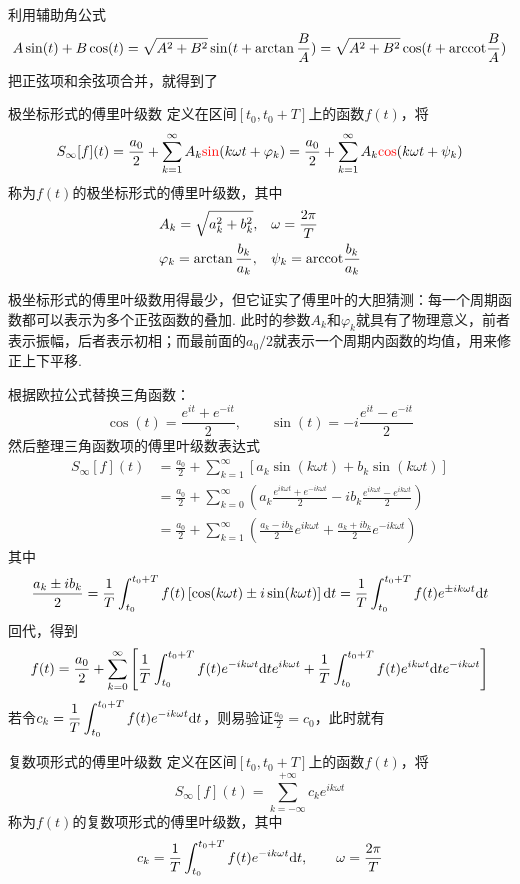 \documentclass[main.tex]{subfiles}
\begin{document}
利用辅助角公式
\[A\sin(t)+B\cos(t)=\sqrt{A^2+B^2}\sin(t+\arctan\frac{B}{A}) = \sqrt{A^2+B^2}\cos(t+{\rm arccot}\frac{B}{A})\]
把正弦项和余弦项合并，就得到了
\begin{definition}{极坐标形式的傅里叶级数}
    定义在区间\([t_0,t_0+T]\)上的函数\(f(t)\)，将
    \[S_{\infty}[f](t) = \frac{a_0}{2}+\sum_{k=1}^{\infty} A_k{\color{red}\sin}(k\omega t+\varphi_k) = \frac{a_0}{2}+\sum_{k=1}^{\infty} A_k{\color{red}\cos}(k\omega t+\psi_k)\]
    称为\(f(t)\)的极坐标形式的傅里叶级数，其中
    \[
        \begin{aligned}
            & A_k = \sqrt{a_k^2+b_k^2},  && \omega = \frac{2\pi}{T} \\
            & \varphi_k = \arctan\frac{b_k}{a_k}, && \psi_k = {\rm arccot}\frac{b_k}{a_k}
        \end{aligned}
    \]
\end{definition}

极坐标形式的傅里叶级数用得最少，但它证实了傅里叶的大胆猜测：每一个周期函数都可以表示为多个正弦函数的叠加. 此时的参数\(A_k\)和\(\varphi_k\)就具有了物理意义，前者表示振幅，后者表示初相；而最前面的\(a_0/2\)就表示一个周期内函数的均值，用来修正上下平移.

\vspace{1cm}

根据欧拉公式替换三角函数：
\[ \cos(t) = \frac{e^{it}+e^{-it}}{2}, \qquad \sin(t) = -i\frac{e^{it}-e^{-it}}{2} \]
然后整理三角函数项的傅里叶级数表达式
\begin{align*}
    S_{\infty}[f](t) &= \frac{a_0}{2}+\sum_{k=1}^{\infty} \left[a_k\sin(k\omega t)+b_k\sin(k\omega t)\right] \\
    &= \frac{a_0}{2} + \sum_{k=0}^{\infty}\left(a_k\frac{e^{ik\omega t}+e^{-ik\omega t}}{2}-ib_k\frac{e^{ik\omega t}-e^{ik\omega t}}{2} \right) \\
    &= \frac{a_0}{2}+\sum_{k=1}^{\infty}\left( \frac{a_k-ib_k}{2}e^{ik\omega t}+\frac{a_k+ib_k}{2}e^{-ik\omega t}\right)
\end{align*}
其中
\[\frac{a_k \pm ib_k}{2} = \frac{1}{T}\int_{t_0}^{t_0+T}f(t)\left[\cos(k\omega t) \pm i\sin(k\omega t) \right] {\rm d}t = \frac{1}{T}\int_{t_0}^{t_0+T}f(t)e^{\pm ik\omega t}{\rm d}t\]
回代，得到
\[f(t) = \frac{a_0}{2} + \sum_{k=0}^{\infty}\left[ \frac{1}{T} \int_{t_0}^{t_0+T}f(t)e^{-ik\omega t}{\rm d}te^{ik\omega t}+ \frac{1}{T}\int_{t_0}^{t_0+T}f(t)e^{ik\omega t}{\rm d}te^{-ik\omega t}\right]\]
若令\(\displaystyle{c_k = \frac{1}{T} \int_{t_0}^{t_0+T}f(t)e^{-ik\omega t}{\rm d}t}\)，则易验证\(\displaystyle{\frac{a_0}{2} = c_0}\)，此时就有
\begin{definition}{复数项形式的傅里叶级数}
    定义在区间\([t_0,t_0+T]\)上的函数\(f(t)\)，将
    \[S_{\infty}[f](t) = \sum_{k=-\infty}^{+\infty}c_ke^{ik\omega t}\]
    称为\(f(t)\)的复数项形式的傅里叶级数，其中
    \[c_k = \frac{1}{T} \int_{t_0}^{t_0+T}f(t)e^{-ik\omega t}{\rm d}t, \qquad \omega=\frac{2\pi}{T}\]
\end{definition}
\end{document}
